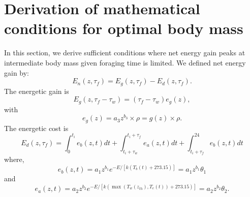\documentclass[12pt]{article}
\begin{document}
\section{Derivation of  mathematical conditions for optimal body mass}
In this section, we derive sufficient conditions where net energy gain peaks at intermediate body mass given foraging time is limited.
We defined net energy gain by:
\begin{equation} \label{eq:main}
	E_n(z, \tau_f) = E_g(z,\tau_f) - E_d(z, \tau_f).
\end{equation}
The energetic gain is
\[
	E_g(z,\tau_f - \tau_w) = (\tau_f - \tau_w) e_g(z),
\]
with
\begin{equation} \label{eq:eg}
	e_g(z) = a_3 z^{b_3} \times \rho  = g(z) \times \rho.
\end{equation}
%
The energetic cost is
\begin{equation} \label{eq:ed}
	E_d(z, \tau_f) = \int_0^{t_i} e_b(z, t) dt + \int_{t_i + \tau_w}^{t_i + \tau_f } e_a(z,t) dt + \int_{t_i+\tau_f}^{24} e_b(z, t) dt
\end{equation}
where,
\begin{equation} \label{eq:eb}
	e_b(z, t) = a_1 z^{b_1} e^{-E/[k (T_b(t)+ 273.15)]} =  a_1 z^{b_1} \theta_1
\end{equation}
and
\begin{equation} \label{eq:ea}
	e_a(z,t) = a_2 z^{b_2}  e^{-E/[k (\max(T_w(z_{th}), T_e(t))+ 273.15)]} =  a_2 z^{b_2} \theta_2.
\end{equation}
\end{document}
